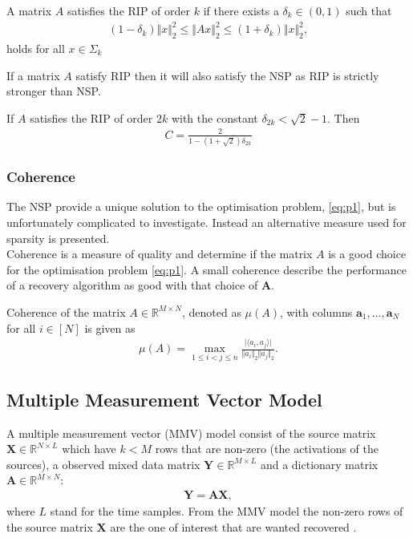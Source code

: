 \begin{definition}
A matrix $A$ satisfies the RIP of order $k$ if there exists a $\delta_k \in (0,1)$ such that
\begin{align*}
(1 - \delta_k) \Vert x \Vert_2^2 \leq \Vert Ax \Vert_2^2 \leq (1 + \delta_k) \Vert x \Vert_2^2,
\end{align*}
holds for all $x \in \Sigma_k$
\end{definition}


If a matrix $A$ satisfy RIP then it will also satisfy the NSP as RIP is strictly stronger than NSP.
\begin{theorem}
If $A$ satisfies the RIP of order $2k$ with the constant $\delta_{2k} < \sqrt{2} -1$. Then
\begin{align*}
C = \frac{2}{1 - (1 + \sqrt{2}) \delta_{2k}}
\end{align*}
\end{theorem} 

\subsubsection{Coherence}
The NSP provide a unique solution to the optimisation problem, \eqref{eq:p1}, but is unfortunately complicated to investigate. Instead an alternative measure used for sparsity is presented.
\\%
Coherence is a measure of quality and determine if the matrix $A$ is a good choice for the optimisation problem \eqref{eq:p1}. A small coherence describe the performance of a recovery algorithm as good with that choice of $\mathbf{A}$. 
\begin{definition}[Coherence]
Coherence of the matrix $A \in \mathbb{R}^{M \times N}$, denoted as $\mu (A)$, with columns $\mathbf{a}_1, \dots, \mathbf{a}_N$ for all $i \in [N]$ is given as
\begin{align*}
\mu (A) = \max_{1 \leq i < j \leq n} \frac{\vert \langle a_i, a_j \rangle \vert}{\Vert a_i \Vert_2 \Vert a_j \Vert_2}.
\end{align*}
\end{definition}


\subsection{Multiple Measurement Vector Model}
A multiple measurement vector (MMV) model consist of the source matrix $\mathbf{X} \in \mathbb{R}^{N \times L}$ which have $k < M$ rows that are non-zero (the activations of the sources), a observed mixed data matrix $\mathbf{Y} \in \mathbb{R}^{M \times L}$ and a dictionary matrix $\mathbf{A} \in \mathbb{R}^{M \times N}$:
\begin{align*}
\mathbf{Y} = \mathbf{AX},
\end{align*}
where $L$ stand for the time samples. From the MMV model the non-zero rows of the source matrix $\mathbf{X}$ are the one of interest that are wanted recovered \cite[p. 11]{PHD}.


